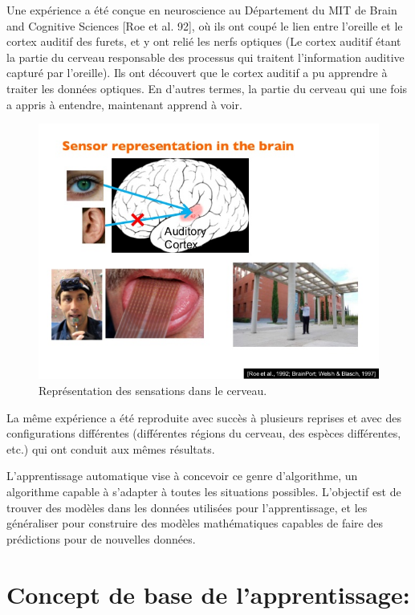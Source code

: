 	Une expérience a été conçue en neuroscience au Département du MIT de Brain and Cognitive Sciences [Roe et al. 92], où ils ont coupé le lien entre l'oreille et le cortex auditif des furets, et y ont relié les nerfs optiques (Le cortex auditif étant la partie du cerveau responsable des processus qui traitent l'information auditive capturé par l'oreille). Ils ont découvert que le cortex auditif a pu apprendre à traiter les données optiques. En d'autres termes, la partie du cerveau qui une fois a appris à entendre, maintenant apprend à voir.

\begin{figure}[H]
	\centering
		\includegraphics[width=5in]{Figures/OneLearningAlgoAndreNg.jpg}
	\caption[An Electron]{Représentation des sensations dans le cerveau.}
	\label{fig:Electron}
\end{figure}


	La même expérience a été reproduite avec succès à plusieurs reprises et avec des configurations différentes (différentes régions du cerveau, des espèces différentes, etc.) qui ont conduit aux mêmes résultats.

	L'apprentissage automatique vise à concevoir ce genre d'algorithme, un algorithme capable à s'adapter à toutes les situations possibles. L'objectif est de trouver des modèles dans les données utilisées pour l'apprentissage, et les généraliser pour construire des modèles mathématiques capables de faire des prédictions pour de nouvelles données.

\section{Concept de base de l'apprentissage:}


